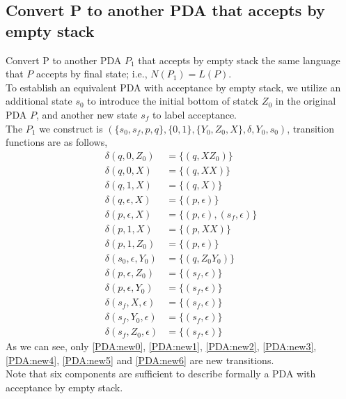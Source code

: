 \documentclass[11pt,a4paper]{article}
\newcommand{\htab}{\hspace*{0.63cm}}
\newcommand{\pg}{\\[0.3cm]}
\newcommand{\Y}{Y_{0}}
\begin{document}
\subsection{Convert P to another PDA that accepts by empty stack}
\htab Convert P to another PDA $P_{1}$ that accepts by empty stack the same language that $P$ accepts by final state; i.e., $N(P_{1}) = L(P)$. \pg
\htab To establish an equivalent PDA with acceptance by empty stack, we utilize an additional state $s_{0}$ to introduce the initial bottom of statck $Z_{0}$ in the original PDA $P$, and another new state $s_{f}$ to label acceptance.\\
\htab The $P_{1}$ we construct is $(\{s_{0}, s_{f}, p, q\}, \{ 0, 1\}, \{\Y, Z_{0}, X\}, \delta, \Y, s_{0})$, transition functions are as follows,
    \begin{align}
        \delta(q, 0, Z_{0}) &= \{ (q, XZ_{0})\} \\
        \delta(q, 0, X) &= \{ (q, XX)\} \\
        \delta(q, 1, X) &= \{ (q, X) \} \\
        \delta(q, \epsilon, X) &= \{ (p, \epsilon)\} \\
        \delta(p, \epsilon, X) &= \{ (p, \epsilon), (s_{f}, \epsilon)\} \label{PDA:new0}\\
        \delta(p, 1, X) &= \{ (p, XX)\} \\
        \delta(p, 1, Z_{0}) &= \{ (p, \epsilon)\} \\
        \delta(s_{0}, \epsilon, \Y) &= \{ (q, Z_{0}\Y)\} \label{PDA:new1} \\
        \delta(p, \epsilon, Z_{0}) &= \{ (s_{f}, \epsilon)\} \label{PDA:new2} \\
        \delta(p, \epsilon, \Y) &= \{ (s_{f}, \epsilon)\} \label{PDA:new3} \\
        \delta(s_{f}, X, \epsilon) &= \{ (s_{f}, \epsilon)\} \label{PDA:new4} \\
        \delta(s_{f}, \Y, \epsilon) &= \{ (s_{f}, \epsilon)\} \label{PDA:new5} \\
        \delta(s_{f}, Z_{0}, \epsilon) &= \{ (s_{f}, \epsilon)\} \label{PDA:new6} 
    \end{align}
    \htab As we can see, only \eqref{PDA:new0}, \eqref{PDA:new1}, \eqref{PDA:new2}, \eqref{PDA:new3}, \eqref{PDA:new4}, \eqref{PDA:new5} and \eqref{PDA:new6} are new transitions. \\
\htab Note that six components are sufficient to describe formally a PDA with acceptance by empty stack.\\
\end{document}
